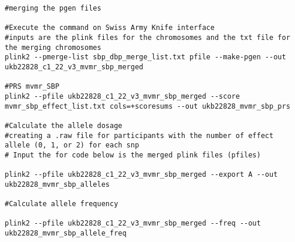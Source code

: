 \documentclass[11pt]{article}
\newcounter{subsubsubsection}[subsubsection]
\begin{document}
\begin{lstlisting}[style=BashStyle]
#merging the pgen files

#Execute the command on Swiss Army Knife interface 
#inputs are the plink files for the chromosomes and the txt file for the merging chromosomes 
plink2 --pmerge-list sbp_dbp_merge_list.txt pfile --make-pgen --out ukb22828_c1_22_v3_mvmr_sbp_merged

#PRS mvmr_SBP
plink2 --pfile ukb22828_c1_22_v3_mvmr_sbp_merged --score mvmr_sbp_effect_list.txt cols=+scoresums --out ukb22828_mvmr_sbp_prs

#Calculate the allele dosage 
#creating a .raw file for participants with the number of effect allele (0, 1, or 2) for each snp
# Input the for code below is the merged plink files (pfiles)

plink2 --pfile ukb22828_c1_22_v3_mvmr_sbp_merged --export A --out ukb22828_mvmr_sbp_alleles

#Calculate allele frequency 

plink2 --pfile ukb22828_c1_22_v3_mvmr_sbp_merged --freq --out ukb22828_mvmr_sbp_allele_freq

\end{lstlisting}

\color{black}

\end{document}
